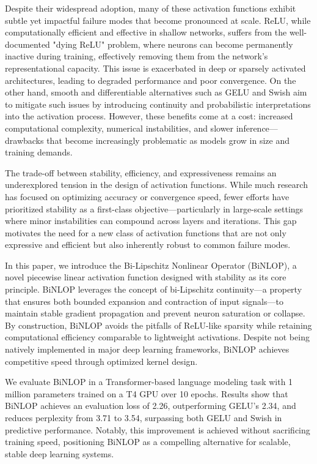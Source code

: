 \documentclass[11pt, twoside, openright, english]{article}
\numberwithin{equation}{section}
\theoremstyle{plain}
\theoremstyle{definition}
\theoremstyle{remark}
\begin{document}
Despite their widespread adoption, many of these activation functions exhibit subtle yet impactful failure modes that become pronounced at scale. ReLU, while computationally efficient and effective in shallow networks, suffers from the well-documented "dying ReLU" problem, where neurons can become permanently inactive during training, effectively removing them from the network’s representational capacity. This issue is exacerbated in deep or sparsely activated architectures, leading to degraded performance and poor convergence. On the other hand, smooth and differentiable alternatives such as GELU and Swish aim to mitigate such issues by introducing continuity and probabilistic interpretations into the activation process. However, these benefits come at a cost: increased computational complexity, numerical instabilities, and slower inference—drawbacks that become increasingly problematic as models grow in size and training demands.

The trade-off between stability, efficiency, and expressiveness remains an underexplored tension in the design of activation functions. While much research has focused on optimizing accuracy or convergence speed, fewer efforts have prioritized stability as a first-class objective—particularly in large-scale settings where minor instabilities can compound across layers and iterations. This gap motivates the need for a new class of activation functions that are not only expressive and efficient but also inherently robust to common failure modes.

In this paper, we introduce the Bi-Lipschitz Nonlinear Operator (BiNLOP), a novel piecewise linear activation function designed with stability as its core principle. BiNLOP leverages the concept of bi-Lipschitz continuity—a property that ensures both bounded expansion and contraction of input signals—to maintain stable gradient propagation and prevent neuron saturation or collapse. By construction, BiNLOP avoids the pitfalls of ReLU-like sparsity while retaining computational efficiency comparable to lightweight activations. Despite not being natively implemented in major deep learning frameworks, BiNLOP achieves competitive speed through optimized kernel design.

We evaluate BiNLOP in a Transformer-based language modeling task with 1 million parameters trained on a T4 GPU over 10 epochs. Results show that BiNLOP achieves an evaluation loss of 2.26, outperforming GELU's 2.34, and reduces perplexity from 3.71 to 3.54, surpassing both GELU and Swish in predictive performance. Notably, this improvement is achieved without sacrificing training speed, positioning BiNLOP as a compelling alternative for scalable, stable deep learning systems.
\end{document}
